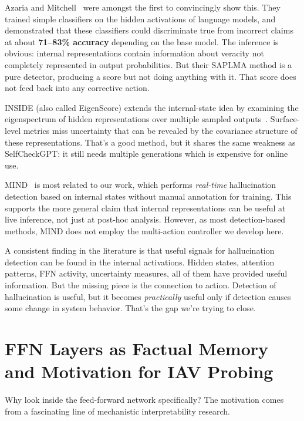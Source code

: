 Azaria and Mitchell~\cite{azaria2023saplma} were amongst the first to convincingly show this.  They trained simple classifiers on the hidden activations of language models, and demonstrated that these classifiers could discriminate true from incorrect claims at about \textbf{71--83\% accuracy} depending on the base model. The inference is obvious: internal representations contain information about veracity not completely represented in output probabilities. But their SAPLMA method is a pure detector, producing a score but not doing anything with it. That score does not feed back into any corrective action.

INSIDE (also called EigenScore) extends the internal-state idea by examining the eigenspectrum of hidden representations over multiple sampled outputs~\cite{chen2024inside}. Surface-level metrics miss uncertainty that can be revealed by the covariance structure of these representations. That's a good method, but it shares the same weakness as SelfCheckGPT: it still needs multiple generations which is expensive for online use.

MIND~\cite{su2024mind} is most related to our work, which performs \emph{real-time} hallucination detection based on internal states without manual annotation for training. This supports the more general claim that internal representations can be useful at live inference, not just at post-hoc analysis. However, as most detection-based methods, MIND does not employ the multi-action controller we develop here.

A consistent finding in the literature is that useful signals for hallucination detection can be found in the internal activations. Hidden states, attention patterns, FFN activity, uncertainty measures, all of them have provided useful information. But the missing piece is the connection to action. Detection of hallucination is useful, but it becomes \emph{practically} useful only if detection causes some change in system behavior. That's the gap we're trying to close.

\section{FFN Layers as Factual Memory and Motivation for IAV Probing}
\label{sec:lit_ffn}

Why look inside the feed-forward network specifically? The motivation comes from a fascinating line of mechanistic interpretability research.

